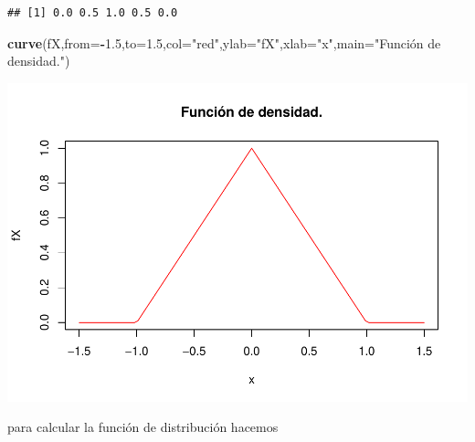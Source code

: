 \documentclass[
]{article}
\newenvironment{Shaded}{\begin{snugshade}}{\end{snugshade}}
\newcommand{\AttributeTok}[1]{\textcolor[rgb]{0.13,0.29,0.53}{#1}}
\newcommand{\FloatTok}[1]{\textcolor[rgb]{0.00,0.00,0.81}{#1}}
\newcommand{\FunctionTok}[1]{\textcolor[rgb]{0.13,0.29,0.53}{\textbf{#1}}}
\newcommand{\NormalTok}[1]{#1}
\newcommand{\SpecialCharTok}[1]{\textcolor[rgb]{0.81,0.36,0.00}{\textbf{#1}}}
\newcommand{\StringTok}[1]{\textcolor[rgb]{0.31,0.60,0.02}{#1}}
\begin{document}
\begin{verbatim}
## [1] 0.0 0.5 1.0 0.5 0.0
\end{verbatim}

\begin{Shaded}
\begin{Highlighting}[]
\FunctionTok{curve}\NormalTok{(fX,}\AttributeTok{from=}\SpecialCharTok{{-}}\FloatTok{1.5}\NormalTok{,}\AttributeTok{to=}\FloatTok{1.5}\NormalTok{,}\AttributeTok{col=}\StringTok{"red"}\NormalTok{,}\AttributeTok{ylab=}\StringTok{"fX"}\NormalTok{,}\AttributeTok{xlab=}\StringTok{"x"}\NormalTok{,}\AttributeTok{main=}\StringTok{"Función de densidad."}\NormalTok{)}
\end{Highlighting}
\end{Shaded}

\includegraphics{Tema-2---Variables-Aleatorias_Soluciones_v1_0_files/figure-latex/unnamed-chunk-4-1.pdf}

para calcular la función de distribución hacemos
\end{document}
